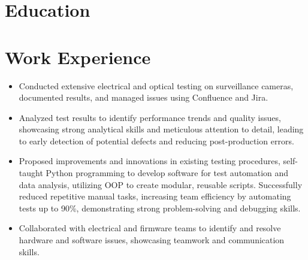 \documentclass[11pt,a4paper,sans]{moderncv}
\begin{document}
\makecvtitle
\vspace{-1.5cm} 

\section{Education}

\vspace{-0.5cm} 

\section{Work Experience}
{
    \begin{itemize}
    \item Conducted extensive electrical and optical testing on surveillance cameras, documented results, and managed issues using Confluence and Jira.
    \item Analyzed test results to identify performance trends and quality issues, showcasing strong analytical skills and meticulous attention to detail, leading to early detection of potential defects and reducing post-production errors.
    \item Proposed improvements and innovations in existing testing procedures, self-taught Python programming to develop software for test automation and data analysis, utilizing OOP to create modular, reusable scripts. Successfully reduced repetitive manual tasks, increasing team efficiency by automating tests up to 90\%, demonstrating strong problem-solving and debugging skills.
    \item Collaborated with electrical and firmware teams to identify and resolve hardware and software issues, showcasing teamwork and communication skills.
    \end{itemize}
}
\end{document}
